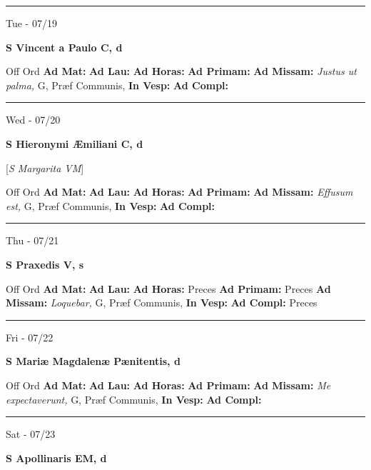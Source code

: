 \documentclass[letterpaper, 10pt]{article}
\begin{document}
\hrule
\begin{center}
Tue - 07/19
\end{center}\textbf{ \large S Vincent a Paulo C, \textnormal{\normalsize d}}
\begin{justify}
Off Ord
\textbf{Ad Mat: }
\textbf{Ad Lau: }
\textbf{Ad Horas: }
\textbf{Ad Primam: }
\textbf{Ad Missam:} \textit{Justus ut palma, } G, Præf Communis, 
\textbf{In Vesp: }
\textbf{Ad Compl: }\end{justify}



\hrule
\begin{center}
Wed - 07/20
\end{center}\textbf{ \large S Hieronymi Æmiliani C, \textnormal{\normalsize d}}

[\textit{S Margarita VM}]
\begin{justify}
Off Ord
\textbf{Ad Mat: }
\textbf{Ad Lau: }
\textbf{Ad Horas: }
\textbf{Ad Primam: }
\textbf{Ad Missam:} \textit{Effusum est, } G, Præf Communis, 
\textbf{In Vesp: }
\textbf{Ad Compl: }\end{justify}



\hrule
\begin{center}
Thu - 07/21
\end{center}\textbf{ \large S Praxedis V, \textnormal{\normalsize s}}
\begin{justify}
Off Ord
\textbf{Ad Mat: }
\textbf{Ad Lau: }
\textbf{Ad Horas: }Preces
\textbf{Ad Primam: }Preces
\textbf{Ad Missam:} \textit{Loquebar, } G, Præf Communis, 
\textbf{In Vesp: }
\textbf{Ad Compl: }Preces\end{justify}



\hrule
\begin{center}
Fri - 07/22
\end{center}\textbf{ \large S Mariæ Magdalenæ Pænitentis, \textnormal{\normalsize d}}
\begin{justify}
Off Ord
\textbf{Ad Mat: }
\textbf{Ad Lau: }
\textbf{Ad Horas: }
\textbf{Ad Primam: }
\textbf{Ad Missam:} \textit{Me expectaverunt, } G, Præf Communis, 
\textbf{In Vesp: }
\textbf{Ad Compl: }\end{justify}



\hrule
\begin{center}
Sat - 07/23
\end{center}\textbf{ \large S Apollinaris EM, \textnormal{\normalsize d}}
\end{document}
